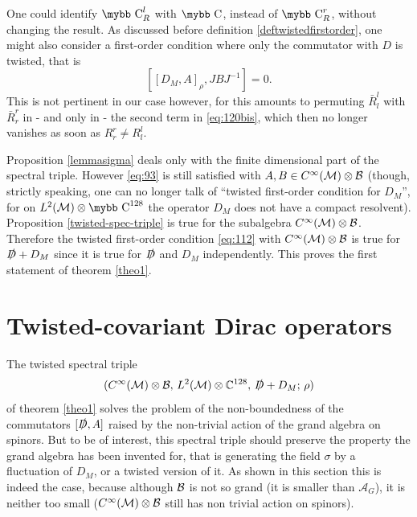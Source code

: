 \documentclass[11pt]{article}
\newcommand{\cinf}{{C^\infty({\cal M})}}
\newcommand{\M}{\mathcal M}
\newcommand{\A}{\mathcal A}
\newcommand{\Ds}{\slashed D}
\def\bb#1{\hbox{\mybb#1}}
\begin{document}
\bigskip 
One could identify $\bb C^l_R$ with $\bb C$, instead of $\bb
C_R^r$, without changing the result. 
As discussed before definition \ref{deftwistedfirstorder}, one might
also consider a first-order condition where only the commutator with
$D$ is twisted, that is
\begin{equation}
  \label{eq:124}
  [[D_M, A]_\rho, JBJ^{-1}] = 0.
\end{equation}
This is not pertinent in our case however, for this amounts to
permuting ${\bar R}^l_l$ with ${\bar R}_r^r$ in - and only in - the
second term in \eqref{eq:120bis}, which then no longer vanishes as soon
as $R^r_r\neq R_l^l$. 
\bigskip

Proposition \ref{lemmasigma}
deals only with the finite dimensional part of the spectral
  triple. However \eqref{eq:93} is still satisfied with $A, B\in
  C^\infty(\M)\otimes \cal B$ (though, strictly speaking, one
 can no longer talk of 
  ``twisted first-order condition for  $D_M$'', for on
$L^2(\M)\otimes \bb C^{128}$ the operator $D_M$  does not have
a compact resolvent). Proposition \ref{twisted-spec-triple}  is true
for the subalgebra $C^\infty(\M)\otimes\cal B$. Therefore the twisted
first-order condition \eqref{eq:112} with $\cinf\otimes\cal B$ is true for $\Ds + D_M$
since it is true for $\Ds$ and $D_M$ independently. This proves the
first statement of theorem \ref{theo1}.

\section{Twisted-covariant Dirac operators}\setcounter{equation}{0}
\label{section:twistedoperators}

The twisted spectral triple
\begin{equation}
  (\cinf\otimes{\cal B},\,  L^2(\M) \otimes {\mathbb C}^{128},\, \Ds + D_M;\, \rho)
\label{eq:189}
  \end{equation}
of theorem \ref{theo1}
  solves the problem of the non-boundedness of
  the commutators $[\Ds, A]$ raised by the non-trivial action of the
  grand algebra on spinors. But to be of
  interest, this spectral triple should preserve
 the property the grand algebra has been invented for,  that is generating the field $\sigma$
  by a fluctuation of $D_M$, or a twisted version of it. As shown in
  this section this is
  indeed the case, because although
  $\cal B$ is not so grand (it is smaller than $\A_G$), it is neither too small ($\cinf\otimes\cal
  B$ still has non  trivial action on spinors).
\end{document}
